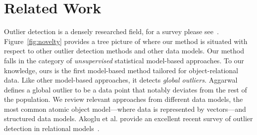 \documentclass[conference]{IEEEtran}
\begin{document}
			
\section{Related Work} \label{sec:related}
Outlier detection is a densely researched field, for a survey please see~\cite{aggarwal2013}.
Figure~\ref{fig:novelty} provides a tree picture of where our method is situated with respect to other outlier detection methods and other data models. 
Our method falls in the category of {\em unsupervised} statistical model-based approaches. To our knowledge, ours is the first model-based method tailored for object-relational data. Like other model-based approaches, it detects {\em global outliers.} Aggarwal \cite{aggarwal2013} defines a global outlier to be a data point that notably deviates from the rest of the population. We review relevant approaches from different data models, the most common atomic object model---where data is represented by vectors---and structured data models. Akoglu et al. provide an excellent recent survey of outlier detection in relational models~\cite{Akoglu2015}.\\
\end{document}
